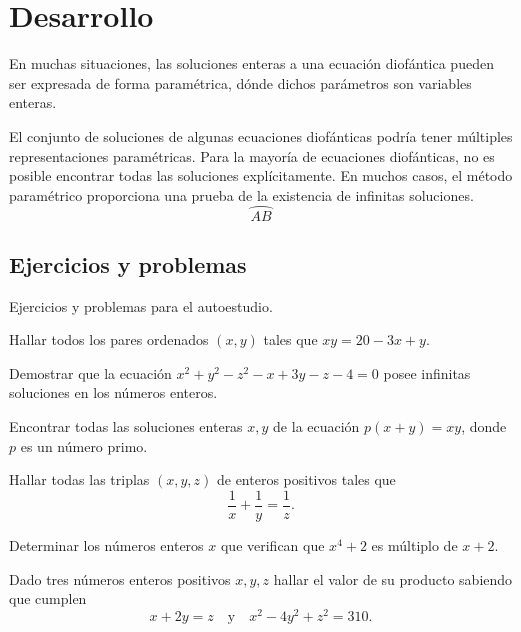 \section{Desarrollo}

En muchas situaciones, las soluciones enteras a una ecuación diofántica pueden ser expresada de forma paramétrica, dónde dichos parámetros son variables enteras.

El conjunto de soluciones de algunas ecuaciones diofánticas podría tener múltiples representaciones paramétricas.
Para la mayoría de ecuaciones diofánticas, no es posible encontrar todas las soluciones explícitamente.
En muchos casos, el método paramétrico proporciona una prueba de la existencia de infinitas soluciones.
\[
    \wideparen{AB}
\]


\subsection{Ejercicios y problemas}

Ejercicios y problemas para el autoestudio.

\begin{exercise}
    Hallar todos los pares ordenados $(x,y)$ tales que $xy = 20 - 3x + y$.
\end{exercise}

\begin{exercise}
    Demostrar que la ecuación $x^2 + y^2 - z^2 - x + 3y - z - 4 = 0$ posee infinitas soluciones en los números enteros.
\end{exercise}

\begin{exercise}
    Encontrar todas las soluciones enteras $x,y$ de la ecuación $p(x + y) = xy$, donde $p$ es un número primo.
\end{exercise}

\begin{exercise}
    Hallar todas las triplas $(x,y,z)$ de enteros positivos tales que
    \[
        \frac{1}{x} + \frac{1}{y} = \frac{1}{z}.
    \]
\end{exercise}

\begin{exercise}
    Determinar los números enteros $x$ que verifican que $x^4 + 2$ es múltiplo de $x + 2$.
\end{exercise}

\begin{exercise}
    Dado tres números enteros positivos $x,y,z$ hallar el valor de su producto sabiendo que cumplen
    \[
        x + 2y = z \quad \text{y} \quad x^2 - 4y^2 + z^2 = 310.
    \]
\end{exercise}

